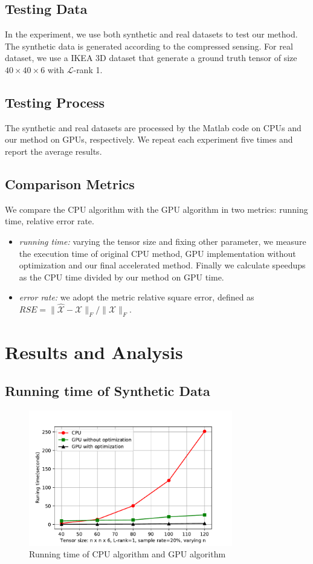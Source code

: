 \documentclass[journal,article,submit,moreauthors,pdftex,10pt,a4paper]{Definitions/mdpi}
\theoremstyle{plain}
\theoremstyle{definition}
\theoremstyle{remark}
\begin{document}
\subsection{Testing Data}
In the experiment, we use both synthetic and real datasets to test our method. The synthetic data is generated according to the compressed sensing\cite{matsuda2017multi}. For real dataset, we use a IKEA 3D dataset that generate a ground truth tensor of size $40 \times 40 \times 6$ with $\mathcal{L}$-rank 1.

\subsection{Testing Process}
The synthetic and real datasets are processed by the Matlab code on CPUs and our method on GPUs, respectively. We repeat each experiment five times and report the average results.

\subsection{Comparison Metrics}
We compare the CPU algorithm with the GPU algorithm in two metrics: running time, relative error rate.
\begin{itemize}
    \item \textit{running time:} varying the tensor size and fixing other parameter, we measure the execution time of original CPU method, GPU implementation without optimization and our final accelerated method. Finally we calculate speedups as the CPU time divided by our method on GPU time.
    \item \textit{error rate:} we adopt the metric relative square error, defined as $ RSE = \| \widehat{\mathcal{X}} - \mathcal{X} \|_F / \|\mathcal{X} \|_F $.
\end{itemize}

\section{Results and Analysis}
\subsection{Running time of Synthetic Data}
\begin{figure}[t]
    \centering
    \includegraphics[width=3.5in]{runtime.pdf}
    \caption{Running time of CPU algorithm and GPU algorithm}
    \label{pic:runtime}
\end{figure}
\end{document}
